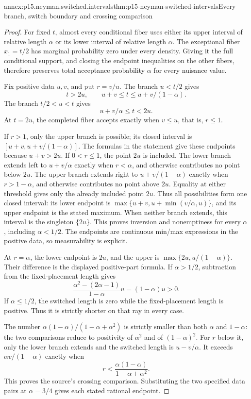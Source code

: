 \begin{annexitem}{annex:p15.neyman.switched.intervals}{thm:p15-neyman-switched-intervals}{Every branch, switch boundary and crossing comparison}
\begin{proof}
For fixed \(t\), almost every conditional fiber
uses either its upper interval of relative length
\(\alpha\) or its lower interval of relative length
\(\alpha\). The exceptional fiber \(x_1=t/2\)
has marginal probability zero under every density.
Giving it the full conditional support, and closing
the endpoint inequalities on the other fibers,
therefore preserves total acceptance probability
\(\alpha\) for every nuisance value.

Fix positive data \(u,v\), and put \(r=v/u\).
The branch \(u<t/2\) gives
\[
              t>2u,\qquad u+v\leq t\leq u+v/(1-\alpha).
\]
The branch \(t/2<u<t\) gives
\[
              u+v/\alpha\leq t<2u.
\]
At \(t=2u\), the completed fiber accepts exactly
when \(v\leq u\), that is, \(r\leq1\).

If \(r>1\), only the upper branch is possible;
its closed interval is \([u+v,u+v/(1-\alpha)]\).
The formulas in the statement give these endpoints
because \(u+v>2u\).
If \(0<r\leq1\), the point \(2u\) is included.
The lower branch extends left to \(u+v/\alpha\)
exactly when \(r<\alpha\), and otherwise contributes
no point below \(2u\). The upper branch extends
right to \(u+v/(1-\alpha)\) exactly when
\(r>1-\alpha\), and otherwise contributes no
point above \(2u\). Equality at either
threshold gives only the already included
point \(2u\).
Thus all possibilities form one closed interval:
its lower endpoint is
\(\max\{u+v,u+\min(v/\alpha,u)\}\),
and its upper endpoint is the stated maximum.
When neither branch extends, this interval
is the singleton \(\{2u\}\).
This proves inversion and nonemptiness for every
\(\alpha\), including \(\alpha<1/2\).
The endpoints are continuous min/max expressions
in the positive data, so measurability is explicit.

At \(r=\alpha\), the lower endpoint is \(2u\),
and the upper is
\(\max\{2u,u/(1-\alpha)\}\).
Their difference is the displayed positive-part
formula. If \(\alpha>1/2\), subtraction from
the fixed-placement length gives
\[
 \frac{\alpha^2-(2\alpha-1)}{1-\alpha}u=(1-\alpha)u>0.
\]
If \(\alpha\leq1/2\), the switched length
is zero while the fixed-placement length
is positive. Thus it is strictly shorter
on that ray in every case.

The number
\(\alpha(1-\alpha)/(1-\alpha+\alpha^2)\)
is strictly smaller than both \(\alpha\)
and \(1-\alpha\): the two comparisons
reduce to positivity of \(\alpha^2\)
and of \((1-\alpha)^2\).
For \(r\) below it, only the lower
branch extends and the switched length
is \(u-v/\alpha\).
It exceeds \(\alpha v/(1-\alpha)\)
exactly when
\[
                       r<\frac{\alpha(1-\alpha)}
                                          {1-\alpha+\alpha^2}.
\]
This proves the source's crossing comparison.
Substituting the two specified data pairs
at \(\alpha=3/4\) gives each stated
rational endpoint.
\end{proof}
\end{annexitem}

